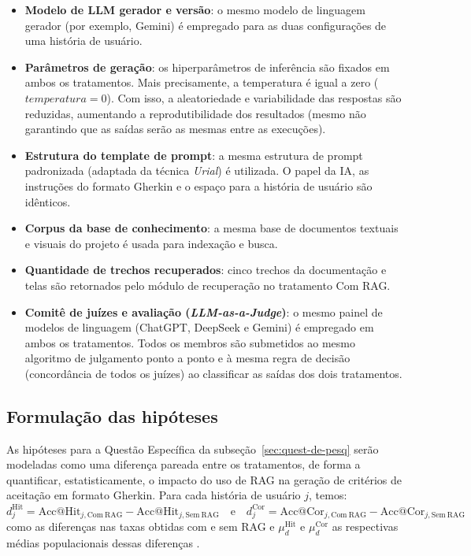 \begin{itemize}
    \item \textbf{Modelo de LLM gerador e versão}: o mesmo modelo de linguagem gerador (por exemplo, Gemini) é empregado para as duas configurações de uma história de usuário.
    \item \textbf{Parâmetros de geração}: os hiperparâmetros de inferência são fixados em ambos os tratamentos. Mais precisamente, a temperatura é igual a zero ($temperatura = 0$). Com isso, a aleatoriedade e variabilidade das respostas são reduzidas, aumentando a reprodutibilidade dos resultados (mesmo não garantindo que as saídas serão as mesmas entre as execuções).
    \item \textbf{Estrutura do template de prompt}: a mesma estrutura de prompt padronizada (adaptada da técnica \textit{Urial}) é utilizada. O papel da IA, as instruções do formato Gherkin e o espaço para a história de usuário são idênticos.
    \item \textbf{Corpus da base de conhecimento}: a mesma base de documentos textuais e visuais do projeto é usada para indexação e busca.
    \item \textbf{Quantidade de trechos recuperados}: cinco trechos da documentação e telas são retornados pelo módulo de recuperação no tratamento Com RAG.
    \item \textbf{Comitê de juízes e avaliação (\textit{LLM-as-a-Judge})}: o mesmo painel de modelos de linguagem
    (ChatGPT, DeepSeek e Gemini) é empregado em ambos os tratamentos. Todos os
    membros são submetidos ao mesmo algoritmo de julgamento ponto a ponto e à
    mesma regra de decisão (concordância de todos os juízes) ao classificar as
    saídas dos dois tratamentos.
\end{itemize}

\subsection{Formulação das hipóteses}

As hipóteses para a Questão Específica da subseção~\ref{sec:quest-de-pesq} serão modeladas como uma diferença pareada entre os tratamentos, de forma a quantificar, estatisticamente, o impacto do uso de RAG na geração de critérios de aceitação em formato Gherkin. Para cada história de usuário $j$, temos:
\[
d_j^{\mathrm{Hit}} = \mathrm{Acc@Hit}_{j,\mathrm{Com\ RAG}} - \mathrm{Acc@Hit}_{j,\mathrm{Sem\ RAG}}
\quad \mathrm{e} \quad
d_j^{\mathrm{Cor}} = \mathrm{Acc@Cor}_{j,\mathrm{Com\ RAG}} - \mathrm{Acc@Cor}_{j,\mathrm{Sem\ RAG}}
\]
como as diferenças nas taxas obtidas com e sem RAG e $\mu_d^{\mathrm{Hit}}$ e $\mu_d^{\mathrm{Cor}}$ as respectivas médias populacionais dessas diferenças \cite{wohlin2000}.

